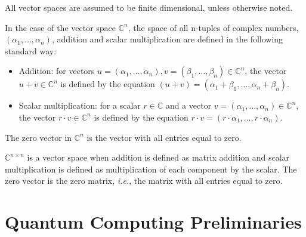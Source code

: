 All vector spaces are assumed to be finite dimensional, unless otherwise noted.  

In the case of the vector space $\mathbb{C}^{n}$, the space of all n-tuples of complex numbers, $(\alpha_1, \ldots , \alpha_n)$, addition and scalar multiplication are defined in the following standard way:
\begin{itemize}
  \item Addition: for vectors $u = (\alpha_1, \ldots , \alpha_n), v = (\beta_1, \ldots , \beta_n)  \in \mathbb{C}^{n}$, the vector $u + v \in \mathbb{C}^{n}$ is defined by the equation $(u + v) = (\alpha_1 + \beta_1, \ldots, \alpha_n+\beta_n)$.
  \item Scalar multiplication: for a scalar $r \in \mathbb{C}$ and a vector $v = (\alpha_1, \ldots , \alpha_n) \in \mathbb{C}^{n}$, the vector $r \cdot v \in \mathbb{C}^{n}$ is defined by the equation $r \cdot v = (r \cdot \alpha_1, \ldots, r \cdot \alpha_n)$.
\end{itemize}
The zero vector in $\mathbb{C}^{n}$ is the vector with all entries equal to zero.

$\mathbb{C}^{n \times n}$ is a vector space when addition is defined as matrix addition and scalar multiplication is defined as multiplication of each component by the scalar. The zero vector is the zero matrix, \textit{i.e.}, the matrix with all entries equal to zero.









\section{Quantum Computing Preliminaries} \label{sec:Quantum Computing Preliminaries}





